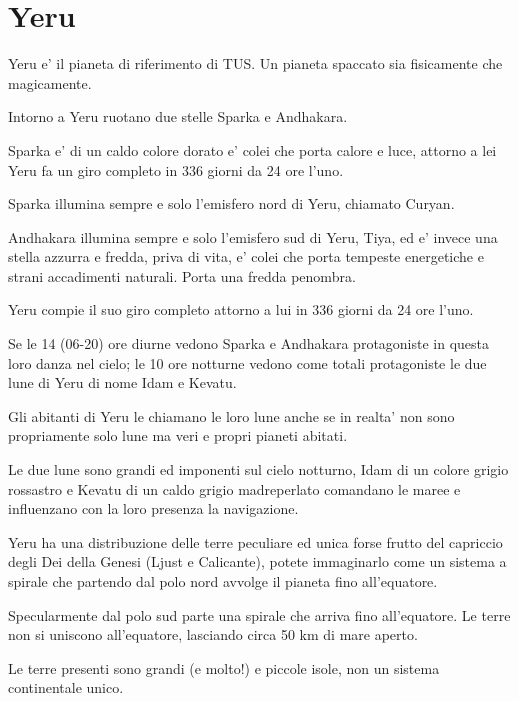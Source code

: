 \documentclass[a4paper,11pt,twoside,openany]{book}
\begin{document}
{\begin{tabular}{ll}
\end{tabular}

\pagebreak

\section{Yeru}

\label{yeru}

Yeru e' il pianeta di riferimento di TUS. Un pianeta spaccato sia fisicamente che magicamente.

Intorno a Yeru ruotano due stelle Sparka e Andhakara.

Sparka e' di un caldo colore dorato e' colei che porta calore e luce, attorno a lei Yeru fa un giro completo in 336 giorni da 24 ore l'uno. 

Sparka illumina sempre e solo l'emisfero nord di Yeru, chiamato Curyan.

Andhakara illumina sempre e solo l'emisfero sud di Yeru, Tiya, ed e' invece una stella azzurra e fredda, priva di vita, e' colei che porta tempeste energetiche e strani accadimenti naturali. Porta una fredda penombra.

Yeru compie il suo giro completo attorno a lui in 336 giorni da 24 ore l'uno.

Se le 14 (06-20) ore diurne vedono Sparka e Andhakara protagoniste in questa loro danza nel cielo; le 10 ore notturne vedono come totali protagoniste le due lune di Yeru di nome Idam e Kevatu. 

Gli abitanti di Yeru le chiamano le loro lune anche se in realta' non sono propriamente solo lune ma veri e propri pianeti abitati.

Le due lune sono grandi ed imponenti sul cielo notturno, Idam di un colore grigio rossastro e Kevatu di un caldo grigio madreperlato comandano le maree e influenzano con la loro presenza la navigazione. 

Yeru ha una distribuzione delle terre peculiare ed unica forse frutto del capriccio degli Dei della Genesi (Ljust e Calicante), potete immaginarlo come un sistema a spirale che partendo dal polo nord avvolge il pianeta fino all'equatore. 

Specularmente dal polo sud parte una spirale che arriva fino all'equatore. Le terre non si uniscono all'equatore, lasciando circa 50 km di mare aperto.

Le terre presenti sono grandi (e molto!) e piccole isole, non un sistema continentale unico.

}
\end{document}
